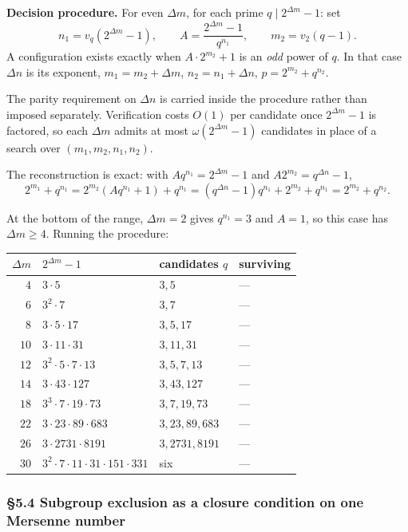 \documentclass[11pt]{article}
\begin{document}
\medskip
\noindent\textbf{Decision procedure.} For even $\Delta m$, for each prime $q \mid 2^{\Delta m}-1$: set
\[
n_1 = v_q\!\left(2^{\Delta m}-1\right), \qquad A = \frac{2^{\Delta m}-1}{q^{n_1}}, \qquad m_2 = v_2(q-1).
\]
A configuration exists exactly when $A\cdot 2^{m_2} + 1$ is an \emph{odd} power of $q$. In that case $\Delta n$ is its exponent, $m_1 = m_2 + \Delta m$, $n_2 = n_1 + \Delta n$, $p = 2^{m_2} + q^{n_2}$.

\medskip
The parity requirement on $\Delta n$ is carried inside the procedure rather than imposed separately. Verification costs $O(1)$ per candidate once $2^{\Delta m}-1$ is factored, so each $\Delta m$ admits at most $\omega\!\left(2^{\Delta m}-1\right)$ candidates in place of a search over $(m_1, m_2, n_1, n_2)$.

The reconstruction is exact: with $A q^{n_1} = 2^{\Delta m}-1$ and $A2^{m_2} = q^{\Delta n}-1$,
\[
2^{m_1} + q^{n_1} = 2^{m_2}\!\left(Aq^{n_1}+1\right) + q^{n_1} = \left(q^{\Delta n}-1\right)q^{n_1} + 2^{m_2} + q^{n_1} = 2^{m_2} + q^{n_2}.
\]

At the bottom of the range, $\Delta m = 2$ gives $q^{n_1} = 3$ and $A = 1$, so this case has $\Delta m \geq 4$. Running the procedure:
\begin{center}
\begin{tabular}{rlll}
\hline
$\Delta m$ & $2^{\Delta m}-1$ & candidates $q$ & surviving \\
\hline
$4$ & $3\cdot 5$ & $3, 5$ & --- \\
$6$ & $3^2\cdot 7$ & $3, 7$ & --- \\
$8$ & $3\cdot 5\cdot 17$ & $3, 5, 17$ & --- \\
$10$ & $3\cdot 11\cdot 31$ & $3, 11, 31$ & --- \\
$12$ & $3^2\cdot 5\cdot 7\cdot 13$ & $3, 5, 7, 13$ & --- \\
$14$ & $3\cdot 43\cdot 127$ & $3, 43, 127$ & --- \\
$18$ & $3^3\cdot 7\cdot 19\cdot 73$ & $3, 7, 19, 73$ & --- \\
$22$ & $3\cdot 23\cdot 89\cdot 683$ & $3, 23, 89, 683$ & --- \\
$26$ & $3\cdot 2731\cdot 8191$ & $3, 2731, 8191$ & --- \\
$30$ & $3^2\cdot 7\cdot 11\cdot 31\cdot 151\cdot 331$ & six & --- \\
\hline
\end{tabular}
\end{center}

\subsubsection*{\S5.4 Subgroup exclusion as a closure condition on one Mersenne number}
\end{document}
